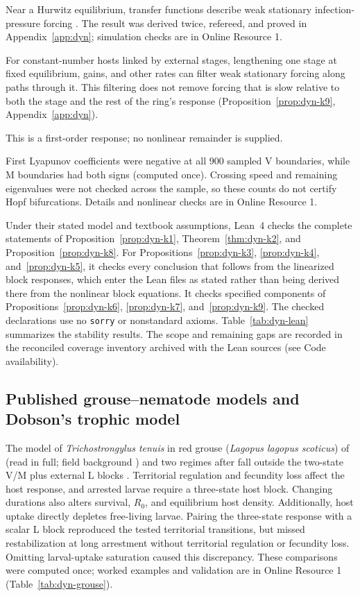 Near a Hurwitz equilibrium, transfer functions describe weak stationary infection-pressure forcing \citep[compare][]{roberts1992,marion2000}. The result was derived twice, refereed, and proved in Appendix~\ref{app:dyn}; simulation checks are in Online Resource 1.

For constant-number hosts linked by external stages, lengthening one stage at fixed equilibrium, gains, and other rates can filter weak stationary forcing along paths through it. This filtering does not remove forcing that is slow relative to both the stage and the rest of the ring's response (Proposition~\ref{prop:dyn-k9}, Appendix~\ref{app:dyn}).

This is a first-order response; no nonlinear remainder is supplied.

First Lyapunov coefficients were negative at all 900 sampled V boundaries, while M boundaries had both signs (computed once). Crossing speed and remaining eigenvalues were not checked across the sample, so these counts do not certify Hopf bifurcations. Details and nonlinear checks are in Online Resource 1.

Under their stated model and textbook assumptions, Lean~4 checks the complete statements of Proposition~\ref{prop:dyn-k1}, Theorem~\ref{thm:dyn-k2}, and Proposition~\ref{prop:dyn-k8}. For Propositions~\ref{prop:dyn-k3}, \ref{prop:dyn-k4}, and~\ref{prop:dyn-k5}, it checks every conclusion that follows from the linearized block responses, which enter the Lean files as stated rather than being derived there from the nonlinear block equations. It checks specified components of Propositions~\ref{prop:dyn-k6}, \ref{prop:dyn-k7}, and~\ref{prop:dyn-k9}. The checked declarations use no \texttt{sorry} or nonstandard axioms. Table~\ref{tab:dyn-lean} summarizes the stability results. The scope and remaining gaps are recorded in the reconciled coverage inventory archived with the Lean sources (see Code availability).

\subsection{Published grouse--nematode models and Dobson's trophic model}\label{subsec:dyn-models}

The model of \emph{Trichostrongylus tenuis} in red grouse (\emph{Lagopus lagopus scoticus}) of \citet{dobson1992} (read in full; field background \citealp{hudson1992}) and two regimes after \citet{gaba2008} fall outside the two-state V/M plus external L blocks \citep[compare][]{may1978,rosa2002}. Territorial regulation and fecundity loss affect the host response, and arrested larvae require a three-state host block. Changing durations also alters survival, $R_0$, and equilibrium host density. Additionally, host uptake directly depletes free-living larvae. Pairing the three-state response with a scalar L block reproduced the tested territorial transitions, but missed restabilization at long arrestment without territorial regulation or fecundity loss. Omitting larval-uptake saturation caused this discrepancy. These comparisons were computed once; worked examples and validation are in Online Resource 1 (Table~\ref{tab:dyn-grouse}).

